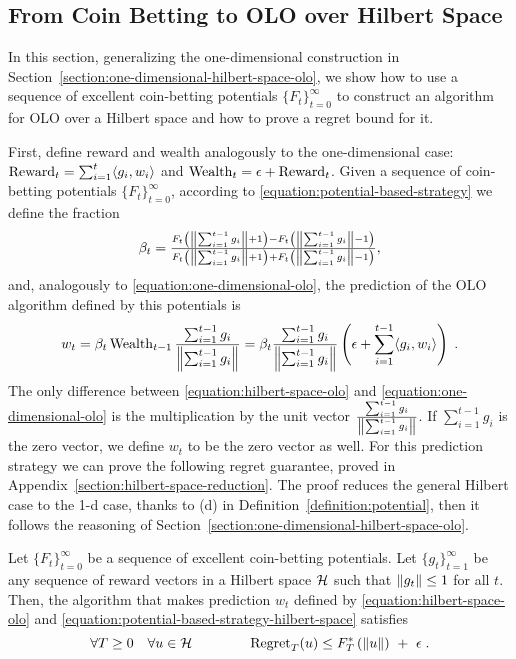 \subsection{From Coin Betting to OLO over Hilbert Space}
\label{section:reduction_hilbert}

In this section, generalizing the
one-dimensional construction in
Section~\ref{section:one-dimensional-hilbert-space-olo}, we show how to use a sequence of excellent coin-betting
potentials $\{F_t\}_{t=0}^\infty$ to construct an algorithm for \ac{OLO} over a
Hilbert space and how to prove a regret bound for it.

First, define reward and wealth analogously to the one-dimensional case:
$\operatorname{Reward}_t = \sum_{i=1}^t \langle g_i, w_i \rangle$ and $\operatorname{Wealth}_t = \epsilon +
\operatorname{Reward}_t$.
Given a sequence of coin-betting potentials $\{F_t\}_{t=0}^\infty$, according
to \eqref{equation:potential-based-strategy} we define the fraction
\begin{equation}
\label{equation:potential-based-strategy-hilbert-space}
\beta_t = \tfrac{F_t \left(\left\|{\sum_{i=1}^{t-1} g_i}\right\| + 1\right) - F_t\left(\left\|{\sum_{i=1}^{t-1} g_i}\right\| - 1 \right)}{F_t\left(\left\|{\sum_{i=1}^{t-1} g_i}\right\| + 1 \right) + F_t\left(\left\|{\sum_{i=1}^{t-1} g_i}\right\| - 1 \right)},
\end{equation}
and, analogously to \eqref{equation:one-dimensional-olo}, the prediction of the OLO algorithm
defined by this potentials is
\begin{equation}
\label{equation:hilbert-space-olo}
w_t = \beta_t \operatorname{Wealth}_{t-1} \frac{\sum_{i=1}^{t-1} g_i}{\left\|{\sum_{i=1}^{t-1} g_i}\right\|}
= \beta_t \frac{\sum_{i=1}^{t-1} g_i}{\left\|{\sum_{i=1}^{t-1} g_i}\right\|} \left(\epsilon+ \sum_{i=1}^{t-1} \langle g_i, w_i\rangle \right) \; .
\end{equation}
The only difference between \eqref{equation:hilbert-space-olo} and
\eqref{equation:one-dimensional-olo} is the multiplication by the unit vector
$\frac{\sum_{i=1}^{t-1} g_i}{\left\|{\sum_{i=1}^{t-1} g_i}\right\|}$. If $\sum_{i=1}^{t-1}
g_i$ is the zero vector, we define $w_t$ to be the zero vector as well.  For this
prediction strategy we can prove the following regret guarantee, proved in
Appendix~\ref{section:hilbert-space-reduction}.  The proof reduces the general
Hilbert case to the 1-d case, thanks to (d) in
Definition~\ref{definition:potential}, then it follows the reasoning of
Section~\ref{section:one-dimensional-hilbert-space-olo}.
%
\begin{theorem}
\label{theorem:hilbert-space-olo-regret-bound}
Let $\{F_t\}_{t=0}^\infty$ be a sequence of excellent coin-betting potentials.
Let $\{g_t\}_{t=1}^\infty$ be any sequence of reward vectors in a Hilbert space
$\mathcal{H}$ such that $\left\|{g_t}\right\| \le 1$ for all $t$. Then, the algorithm that makes
prediction $w_t$ defined by \eqref{equation:hilbert-space-olo} and
\eqref{equation:potential-based-strategy-hilbert-space} satisfies
\[
\forall T \ge 0 \quad
\forall u \in \mathcal{H} \qquad \qquad
\operatorname{Regret}_T(u) \le F_T^*\left(\left\|{u}\right\| \right) \ + \ \epsilon \; .
\]
\end{theorem}
